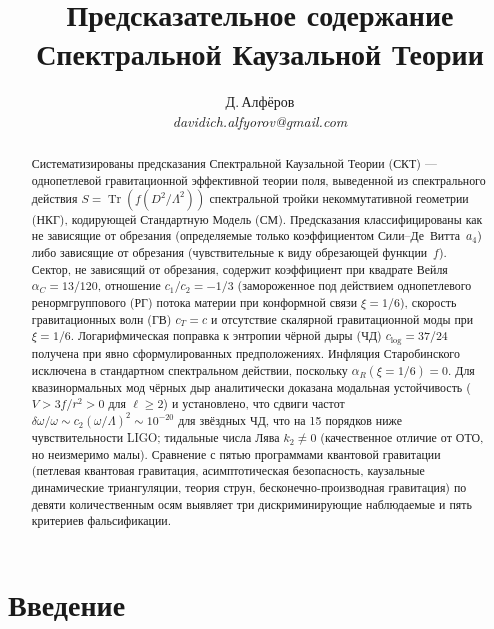 \documentclass[12pt,a4paper]{article}
\title{Предсказательное содержание Спектральной Каузальной Теории}
\author{Д.\,Алфёров\\[4pt]
\small\textit{davidich.alfyorov@gmail.com}}
\date{}
\theoremstyle{plain}
\theoremstyle{definition}
\theoremstyle{remark}
\newcommand{\Tr}{\operatorname{Tr}}
\begin{document}
\maketitle

\begin{abstract}

Систематизированы предсказания Спектральной Каузальной Теории (СКТ) ---
однопетлевой гравитационной эффективной теории поля, выведенной из
спектрального действия $S = \Tr(f(D^2/\Lambda^2))$ спектральной тройки некоммутативной геометрии (НКГ),
кодирующей Стандартную Модель (СМ). Предсказания
классифицированы как не зависящие от обрезания (определяемые только
коэффициентом Сили--Де~Витта~$a_4$) либо зависящие от обрезания
(чувствительные к виду обрезающей функции~$f$). Сектор, не зависящий
от обрезания, содержит коэффициент при квадрате Вейля
$\alpha_C = 13/120$, отношение $c_1/c_2 = -1/3$ (замороженное
под действием однопетлевого ренормгруппового (РГ) потока материи при
конформной связи $\xi = 1/6$), скорость гравитационных волн (ГВ) $c_T = c$
и отсутствие скалярной гравитационной моды при $\xi = 1/6$.
Логарифмическая поправка к энтропии чёрной дыры (ЧД) $c_{\log} = 37/24$
получена при явно сформулированных предположениях. Инфляция
Старобинского исключена в стандартном спектральном действии, поскольку
$\alpha_R(\xi = 1/6) = 0$. Для квазинормальных мод чёрных дыр аналитически доказана модальная
устойчивость ($V > 3f/r^2 > 0$ для $\ell \geq 2$) и установлено, что
сдвиги частот $\delta\omega/\omega \sim c_2(\omega/\Lambda)^2 \sim
10^{-20}$ для звёздных ЧД, что на 15 порядков ниже чувствительности
LIGO; тидальные числа Лява $k_2 \neq 0$ (качественное отличие от
ОТО, но неизмеримо малы). Сравнение с пятью программами квантовой
гравитации (петлевая квантовая гравитация, асимптотическая
безопасность, каузальные динамические триангуляции, теория струн,
бесконечно-производная гравитация) по девяти количественным осям
выявляет три дискриминирующие наблюдаемые и пять критериев
фальсификации.

\end{abstract}

\tableofcontents
\newpage

\section{Введение}
\label{sec:intro}
\end{document}
